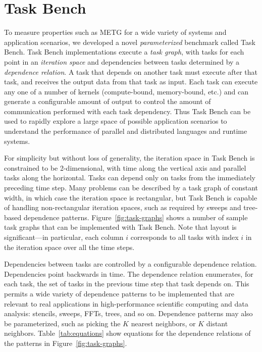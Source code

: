 \section{Task Bench}
\label{sec:task-bench}



To measure properties such as METG for a wide variety of
systems and application scenarios, we developed a novel
\emph{parameterized} benchmark called Task Bench. Task Bench
implementations execute a \emph{task graph}, with tasks for each point
in an \emph{iteration space} and dependencies between tasks determined
by a \emph{dependence relation}. A task that depends on another task
must execute after that task, and receives the output data from that
task as input. Each task can execute any one of a
number of kernels (compute-bound, memory-bound, etc.) and can generate
a configurable amount of output to control the amount of communication
performed with each task dependency. Thus Task Bench can be used to
rapidly explore a large space of possible application scenarios to
understand the performance of parallel and
distributed languages and runtime systems.

For simplicity but without loss of generality, the iteration space in
Task Bench is constrained to be 2-dimensional, with time along
the vertical axis and parallel tasks along the
horizontal. Tasks can depend only on tasks from the immediately
preceding time step. Many problems can be described by a task graph of
constant width, in which case the iteration space is rectangular, but
Task Bench is capable of handling non-rectangular iteration spaces,
such as required by sweeps and tree-based dependence
patterns. Figure~\ref{fig:task-graphs} shows a number of sample task
graphs that can be implemented with Task Bench. Note that layout is
significant---in particular, each column $i$ corresponds to all tasks
with index $i$ in the iteration space over all the time steps.

Dependencies between tasks are controlled by a configurable dependence
relation. Dependencies point backwards in time. The
dependence relation enumerates, for each task, the set of tasks in the
previous time step that task depends on. This permits a wide variety
of dependence patterns to be implemented that are relevant to real
applications in high-performance scientific computing and data analysis: stencils,
sweeps, FFTs, trees, and so on. Dependence patterns may also be
parameterized, such as picking the $K$ nearest neighbors, or $K$
distant neighbors. Table~\ref{tab:equations} show equations for the
dependence relations of the patterns in Figure~\ref{fig:task-graphs}.

